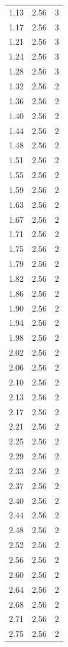 \begin{longtable}{lrr}
  1.13 & 2.56 & 3 \\
  1.17 & 2.56 & 3 \\
  1.21 & 2.56 & 3 \\
  1.24 & 2.56 & 3 \\
  1.28 & 2.56 & 3 \\
  1.32 & 2.56 & 2 \\
  1.36 & 2.56 & 2 \\
  1.40 & 2.56 & 2 \\
  1.44 & 2.56 & 2 \\
  1.48 & 2.56 & 2 \\
  1.51 & 2.56 & 2 \\
  1.55 & 2.56 & 2 \\
  1.59 & 2.56 & 2 \\
  1.63 & 2.56 & 2 \\
  1.67 & 2.56 & 2 \\
  1.71 & 2.56 & 2 \\
  1.75 & 2.56 & 2 \\
  1.79 & 2.56 & 2 \\
  1.82 & 2.56 & 2 \\
  1.86 & 2.56 & 2 \\
  1.90 & 2.56 & 2 \\
  1.94 & 2.56 & 2 \\
  1.98 & 2.56 & 2 \\
  2.02 & 2.56 & 2 \\
  2.06 & 2.56 & 2 \\
  2.10 & 2.56 & 2 \\
  2.13 & 2.56 & 2 \\
  2.17 & 2.56 & 2 \\
  2.21 & 2.56 & 2 \\
  2.25 & 2.56 & 2 \\
  2.29 & 2.56 & 2 \\
  2.33 & 2.56 & 2 \\
  2.37 & 2.56 & 2 \\
  2.40 & 2.56 & 2 \\
  2.44 & 2.56 & 2 \\
  2.48 & 2.56 & 2 \\
  2.52 & 2.56 & 2 \\
  2.56 & 2.56 & 2 \\
  2.60 & 2.56 & 2 \\
  2.64 & 2.56 & 2 \\
  2.68 & 2.56 & 2 \\
  2.71 & 2.56 & 2 \\
  2.75 & 2.56 & 2 \\

\end{longtable}
